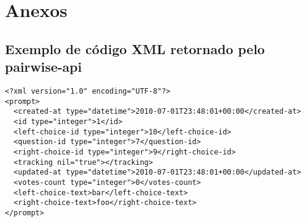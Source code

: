
\section{Anexos}

\subsection{Exemplo de código XML retornado pelo pairwise-api}

\begin{lstlisting}
<?xml version="1.0" encoding="UTF-8"?>
<prompt>
  <created-at type="datetime">2010-07-01T23:48:01+00:00</created-at>
  <id type="integer">1</id>
  <left-choice-id type="integer">10</left-choice-id>
  <question-id type="integer">7</question-id>
  <right-choice-id type="integer">9</right-choice-id>
  <tracking nil="true"></tracking>
  <updated-at type="datetime">2010-07-01T23:48:01+00:00</updated-at>
  <votes-count type="integer">0</votes-count>
  <left-choice-text>bar</left-choice-text>
  <right-choice-text>foo</right-choice-text>
</prompt>
\end{lstlisting}
